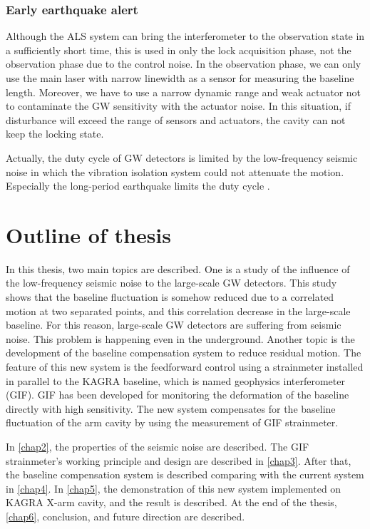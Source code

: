 \subsubsection{Early earthquake alert}
Although the ALS system can bring the interferometer to the observation state in a sufficiently short time, this is used in only the lock acquisition phase, not the observation phase due to the control noise. In the observation phase, we can only use the main laser with narrow linewidth as a sensor for measuring the baseline length. Moreover, we have to use a narrow dynamic range and weak actuator not to contaminate the GW sensitivity with the actuator noise. In this situation, if disturbance will exceed the range of sensors and actuators, the cavity can not keep the locking state. 

Actually, the duty cycle of GW detectors is limited by the low-frequency seismic noise in which the vibration isolation system could not attenuate the motion. Especially the long-period earthquake limits the duty cycle \cite{Biscans2018control}. 

\section{Outline of thesis} \label{sec:15}
In this thesis, two main topics are described. One is a study of the influence of the low-frequency seismic noise to the large-scale GW detectors. This study shows that the baseline fluctuation is somehow reduced due to a correlated motion at two separated points, and this correlation decrease in the large-scale baseline. For this reason, large-scale GW detectors are suffering from seismic noise. This problem is happening even in the underground. Another topic is the development of the baseline compensation system to reduce residual motion. The feature of this new system is the feedforward control using a strainmeter installed in parallel to the KAGRA baseline, which is named geophysics interferometer (GIF). GIF has been developed for monitoring the deformation of the baseline directly with high sensitivity. The new system compensates for the baseline fluctuation of the arm cavity by using the measurement of GIF strainmeter.

In \cref{chap2}, the properties of the seismic noise are described. The GIF strainmeter's working principle and design are described in \cref{chap3}. After that, the baseline compensation system is described comparing with the current system in \cref{chap4}. In \cref{chap5}, the demonstration of this new system implemented on KAGRA X-arm cavity, and the result is described. At the end of the thesis, \cref{chap6}, conclusion, and future direction are described.

